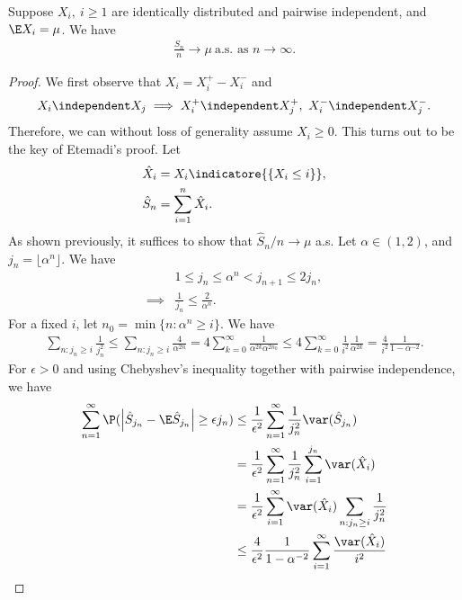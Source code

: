 \documentclass[../aipt.tex]{subfiles}
\begin{document}
\begin{Theorem}
Suppose $X_i,\ i \geq 1$ are identically distributed and pairwise independent, and $\E X_i = \mu$. We have
\begin{align*}
\frac{S_n}{n} \to \mu \ \text{a.s. as $n\to\infty$}.
\end{align*}
\end{Theorem}
\begin{proof}
We first observe that $X_i = X_i^+ - X_i^-$ and
\begin{align*}
X_i \independent X_j \implies 
X_i^+ \independent X_j^+,\ X_i^- \independent X_j^-.
\end{align*}
Therefore, we can without loss of generality assume $X_i \geq 0$. This turns out to be the key of Etemadi's proof. Let
\begin{align*}
\hat{X}_i &= X_i \indicatore{\{X_i \leq i\}}, \\
\hat{S}_n &= \sum_{i = 1}^n \hat{X}_i.
\end{align*}
As shown previously, it suffices to show that $\hat{S}_n/n \to \mu$ a.s. Let $\alpha \in (1, 2)$, and $j_n = \lfloor \alpha^n \rfloor$. We have
\begin{align*}
&1 \leq j_n \leq \alpha^n < j_{n+1} \leq 2 j_n, \\
\implies
&\frac{1}{j_n} \leq \frac{2}{\alpha^n}.
\end{align*}
For a fixed $i$, let $n_0 = \min \{n:\alpha^n \geq i\}$. We have
\begin{align}
\sum_{n: j_n \geq i} \frac{1}{j_n^2} 
\leq \sum_{n: j_n \geq i} \frac{4}{\alpha^{2n}} 
= 4 \sum_{k=0}^{\infty} \frac{1}{\alpha^{2k} \alpha^{2 n_0}}
\leq 4 \sum_{k=0}^{\infty} \frac{1}{i^2} \frac{1}{\alpha^{2k}}
= \frac{4}{i^2} \frac{1}{1 - \alpha^{-2}}. \label{ineq:sumjn}
\end{align}
For $\epsilon > 0$ and using Chebyshev's inequality together with pairwise independence, we have
\begin{align*}
\sum_{n=1}^{\infty} \P(\left| \hat{S}_{j_n} - \E \hat{S}_{j_n} \right| \geq \epsilon j_n)
&\leq \frac{1}{\epsilon^2} \sum_{n=1}^{\infty} \frac{1}{j_n^2} \var(\hat{S}_{j_n}) \\
&= \frac{1}{\epsilon^2} \sum_{n=1}^{\infty} \frac{1}{j_n^2} \sum_{i=1}^{j_n} \var(\hat{X}_i) \\
&= \frac{1}{\epsilon^2} \sum_{i=1}^{\infty} \var(\hat{X}_i) \sum_{n:j_n \geq i} \frac{1}{j_n^2} \\
&\leq \frac{4}{\epsilon^2} \frac{1}{1 - \alpha^{-2}} \sum_{i=1}^{\infty} \frac{\var(\hat{X}_i)}{i^2} \\

\end{align*}
\end{proof}
\end{document}
